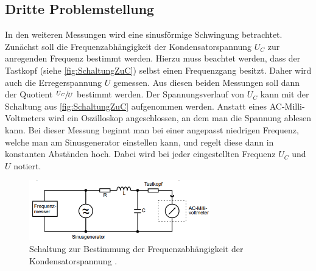 \subsection{Dritte Problemstellung}
In den weiteren Messungen wird eine sinusförmige Schwingung betrachtet. Zunächst soll die Frequenzabhängigkeit der Kondensatorspannung $U_{C}$ zur anregenden Frequenz bestimmt 
werden. Hierzu muss beachtet werden, dass der Tastkopf (siehe \autoref{fig:SchaltungZuC}) selbst einen Frequenzgang besitzt. Daher wird auch die Erregerspannung $U$ gemessen.
Aus diesen beiden Messungen soll dann der Quotient $\sfrac{U_{C}}{U}$ bestimmt werden. Der Spannungsverlauf von  $U_{C}$ kann mit der Schaltung aus \autoref{fig:SchaltungZuC}
aufgenommen werden. Anstatt eines AC-Milli-Voltmeters wird ein Oszilloskop angeschlossen, an dem man die Spannung ablesen kann. Bei dieser Messung beginnt man bei einer angepasst
niedrigen Frequenz, welche man am Sinusgenerator einstellen kann, und regelt diese dann in konstanten Abständen hoch. Dabei wird bei jeder eingestellten Frequenz $U_{C}$ und 
$U$ notiert. 
\begin{figure}
    \centering
    \includegraphics[width=0.7\textwidth]{content/SchaltungZuC.pdf}
    \caption{Schaltung zur Bestimmung der Frequenzabhängigkeit der Kondensatorspannung \cite{v354}.}    
    \label{fig:SchaltungZuC}
\end{figure}
